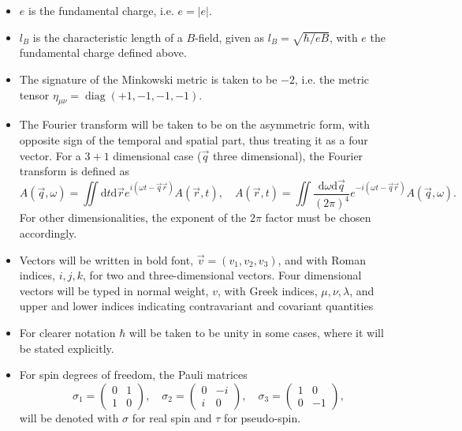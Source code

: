 \begin{itemize}
\item $e$ is the fundamental charge, i.e. $e = |e|$.
\item $l_B$ is the characteristic length of a $B$-field, given as $l_B= \sqrt{\hbar /eB}$, with $e$ the fundamental charge defined above.
\item The signature of the Minkowski metric is taken to be $-2$, i.e. the metric tensor $\eta _{\mu \nu } = \operatorname{diag} (+1, -1,-1,-1)$.
\item The Fourier transform will be taken to be on the asymmetric form, with opposite sign of the temporal and spatial part, thus treating it as a four vector.
  For a $3+1$ dimensional case ($\vec{q}$ three dimensional), the Fourier transform is defined as
  \begin{equation}
    \label{eq:define-fourier}
    A(\vec{q}, \omega ) =
    \iint \mathrm{d}t \mathrm{d} \vec{r}
    e^{i(\omega  t - \vec{q} \vec{r} )}
    A(\vec{r}, t),
    \quad
    A(\vec{r}, t) =
    \iint 
    \frac{\mathrm{d}\omega  \mathrm{d} \vec{q}}{(2\pi )^4}
    e^{-i(\omega  t - \vec{q} \vec{r} )}
    A(\vec{q}, \omega).
  \end{equation}
  For other dimensionalities, the exponent of the $2\pi $ factor must be chosen accordingly.

\item Vectors will be written in bold font, $\vec{v} = (v_1, v_2, v_3)$, and with Roman indices, $i, j, k$, for two and three-dimensional vectors.
  Four dimensional vectors will be typed in normal weight, $v$, with Greek indices, $\mu ,  \nu , \lambda $, and upper and lower indices indicating contravariant and covariant quantities
\item For clearer notation $\hbar$ will be taken to be unity in some cases, where it will be stated explicitly. 
\item For spin degrees of freedom, the Pauli matrices
  \begin{equation}
    \sigma _1 =
    \begin{pmatrix}
      0 & 1\\ 1 & 0
    \end{pmatrix},
    \quad
    \sigma _2 =
    \begin{pmatrix}
      0 & -i\\ i & 0
    \end{pmatrix},
    \quad
    \sigma _3 =
    \begin{pmatrix}
      1 & 0\\ 0 & -1
    \end{pmatrix},
  \end{equation}
  will be denoted with $\sigma $ for real spin and $\tau $ for pseudo-spin.
  

\end{itemize}
